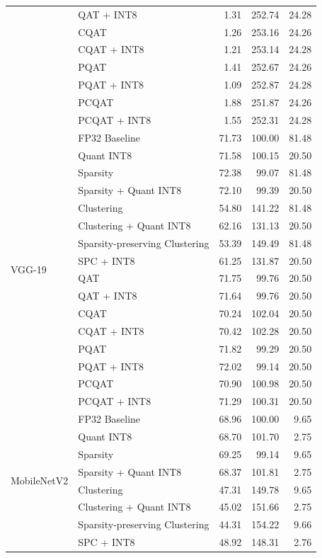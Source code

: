 \begin{table}[htbp]
{\begin{tabular}{llrrr}
  & QAT + INT8 & 1.31 & 252.74 & 24.28 \\
  & CQAT & 1.26 & 253.16 & 24.26 \\
  & CQAT + INT8 & 1.21 & 253.14 & 24.28 \\
  & PQAT & 1.41 & 252.67 & 24.26 \\
  & PQAT + INT8 & 1.09 & 252.87 & 24.28 \\
  & PCQAT & 1.88 & 251.87 & 24.26 \\
  & PCQAT + INT8 & 1.55 & 252.31 & 24.28 \\
\midrule
\multirow{16}{*}{VGG-19}
  & FP32 Baseline & 71.73 & 100.00 & 81.48 \\
  & Quant INT8 & 71.58 & 100.15 & 20.50 \\
  & Sparsity & 72.38 & 99.07 & 81.48 \\
  & Sparsity + Quant INT8 & 72.10 & 99.39 & 20.50 \\
  & Clustering & 54.80 & 141.22 & 81.48 \\
  & Clustering + Quant INT8 & 62.16 & 131.13 & 20.50 \\
  & Sparsity-preserving Clustering & 53.39 & 149.49 & 81.48 \\
  & SPC + INT8 & 61.25 & 131.87 & 20.50 \\
  & QAT & 71.75 & 99.76 & 20.50 \\
  & QAT + INT8 & 71.64 & 99.76 & 20.50 \\
  & CQAT & 70.24 & 102.04 & 20.50 \\
  & CQAT + INT8 & 70.42 & 102.28 & 20.50 \\
  & PQAT & 71.82 & 99.29 & 20.50 \\
  & PQAT + INT8 & 72.02 & 99.14 & 20.50 \\
  & PCQAT & 70.90 & 100.98 & 20.50 \\
  & PCQAT + INT8 & 71.29 & 100.31 & 20.50 \\
\midrule
\multirow{16}{*}{MobileNetV2}
  & FP32 Baseline & 68.96 & 100.00 & 9.65 \\
  & Quant INT8 & 68.70 & 101.70 & 2.75 \\
  & Sparsity & 69.25 & 99.14 & 9.65 \\
  & Sparsity + Quant INT8 & 68.37 & 101.81 & 2.75 \\
  & Clustering & 47.31 & 149.78 & 9.65 \\
  & Clustering + Quant INT8 & 45.02 & 151.66 & 2.75 \\
  & Sparsity-preserving Clustering & 44.31 & 154.22 & 9.66 \\
  & SPC + INT8 & 48.92 & 148.31 & 2.76 \\

\end{tabular}}
\end{table}
